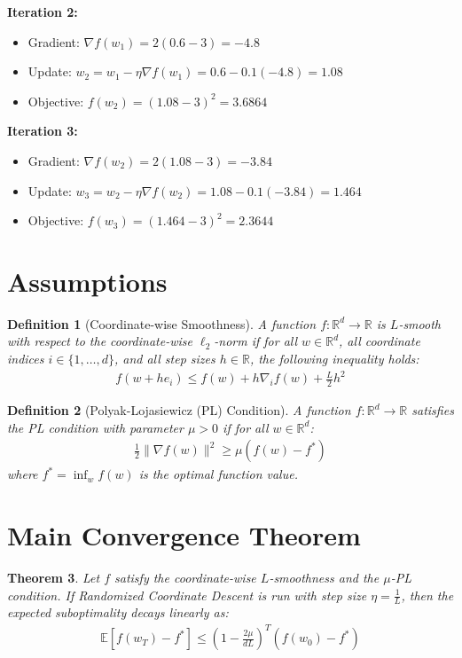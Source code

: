 \documentclass{article}
\newtheorem{theorem}{Theorem}
\newtheorem{definition}[theorem]{Definition}
\begin{document}
\textbf{Iteration 2:}
\begin{itemize}
    \item Gradient: $\nabla f(w_1) = 2(0.6-3) = -4.8$
    \item Update: $w_2 = w_1 - \eta \nabla f(w_1) = 0.6 - 0.1(-4.8) = 1.08$
    \item Objective: $f(w_2) = (1.08-3)^2 = 3.6864$
\end{itemize}

\textbf{Iteration 3:}
\begin{itemize}
    \item Gradient: $\nabla f(w_2) = 2(1.08-3) = -3.84$
    \item Update: $w_3 = w_2 - \eta \nabla f(w_2) = 1.08 - 0.1(-3.84) = 1.464$
    \item Objective: $f(w_3) = (1.464-3)^2 = 2.3644$
\end{itemize}

\section*{Assumptions}
\begin{definition}[Coordinate-wise Smoothness]
A function $f: \mathbb{R}^d \to \mathbb{R}$ is $L$-smooth with respect to the coordinate-wise $\ell_2$-norm if for all $w \in \mathbb{R}^d$, all coordinate indices $i \in \{1, \dots, d\}$, and all step sizes $h \in \mathbb{R}$, the following inequality holds:
\begin{align*}
f(w + h e_i) \leq f(w) + h \nabla_i f(w) + \frac{L}{2} h^2
\end{align*}
\end{definition}

\begin{definition}[Polyak-Lojasiewicz (PL) Condition]
A function $f: \mathbb{R}^d \to \mathbb{R}$ satisfies the PL condition with parameter $\mu > 0$ if for all $w \in \mathbb{R}^d$:
\begin{align*}
\frac{1}{2} \|\nabla f(w)\|^2 \geq \mu (f(w) - f^*)
\end{align*}
where $f^* = \inf_{w} f(w)$ is the optimal function value.
\end{definition}

\section*{Main Convergence Theorem}
\begin{theorem}
Let $f$ satisfy the coordinate-wise $L$-smoothness and the $\mu$-PL condition. If Randomized Coordinate Descent is run with step size $\eta = \frac{1}{L}$, then the expected suboptimality decays linearly as:
\begin{align*}
\mathbb{E}[f(w_T) - f^*] \leq \left(1 - \frac{2\mu}{dL}\right)^T (f(w_0) - f^*)
\end{align*}
\end{theorem}
\end{document}
